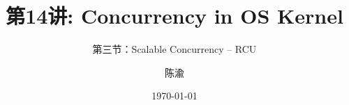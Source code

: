 


\title[第14讲]{第14讲: Concurrency in OS Kernel} %
\subtitle{第三节：Scalable Concurrency -- RCU}
\author{陈渝} %
\date{\today} %





\begin{frame}
\titlepage %
\end{frame}
    
%
%

